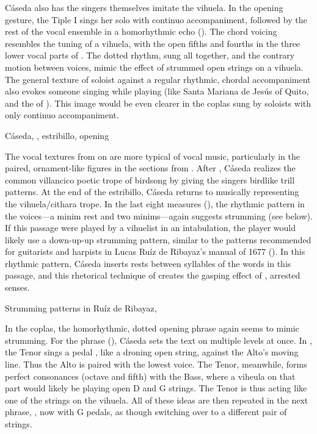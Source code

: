 Cáseda also has the singers themselves imitate the vihuela.
In the opening gesture, the Tiple I sings her solo with continuo accompaniment,
followed by the rest of the vocal ensemble in a homorhythmic echo
().
The chord voicing resembles the tuning of a vihuela, with the open fifths and
fourths in the three lower vocal parts of .
The dotted rhythm, sung all together, and the contrary motion between voices,
mimic the effect of strummed open strings on a vihuela.
The general texture of soloist against a regular rhythmic, chordal
accompaniment also evokes someone singing while playing (like Santa Mariana de
Jesús of Quito, and the  of ).
This image would be even clearer in the coplas sung by soloists with only
continuo accompaniment.

{Cáseda, , estribillo, opening}

The vocal textures from  on are more typical of vocal music,
particularly in the paired, ornament-like figures in the sections from
.
After , Cáseda realizes the common villancico poetic trope of
birdsong by giving the singers birdlike trill patterns. 
At the end of the estribillo, Cáseda returns to musically representing the
vihuela/cithara trope.
In the last eight measures (), the rhythmic pattern in the
voices---a minim rest and two minims---again suggests strumming (see
 below).
If this passage were played by a vihuelist in an intabulation, the player would
likely use a down-up-up strumming pattern, similar to the patterns recommended
for guitarists and harpists in Lucas Ruíz de Ribayaz's manual  of 1677 ().%
    \Autocite[9]{Ruiz:Luz}
In this rhythmic pattern, Cáseda inserts rests between syllables of the words
in this passage, and this rhetorical technique of  creates the
gasping effect of , arrested senses.

{Strumming patterns in Ruíz de Ribayaz, }

In the coplas, the homorhythmic, dotted opening phrase again seems to mimic
strumming.
For the phrase  (),
Cáseda sets the text on multiple levels at once.
In , the Tenor sings a pedal , like a droning open
string, against the Alto's moving line.
Thus the  Alto is paired with the lowest voice.
The Tenor, meanwhile, forms perfect consonances (octave and fifth) with the
Bass, where a viheula on that part would likely be playing open D and G strings. 
The Tenor is thus acting like one of the strings on the vihuela.
All of these ideas are then repeated in the next phrase, , now
with G pedals, as though switching over to a different pair of strings.

